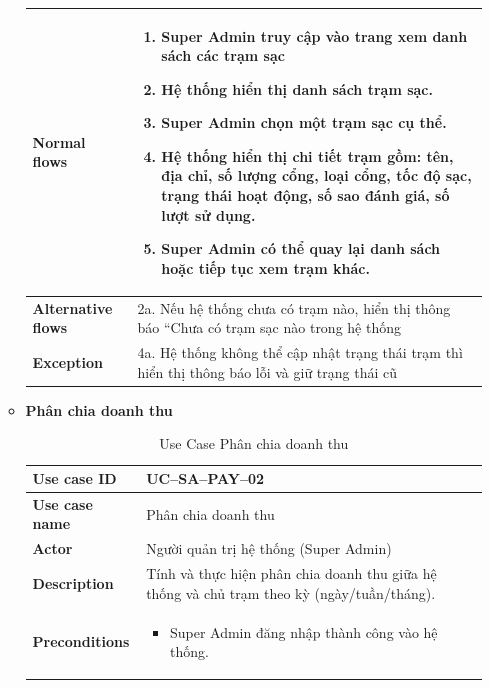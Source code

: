 \begin{enumerate}[label=\textbf{\alph*)}]
\begin{itemize}
\begin{center}
\begin{longtable}{|m{}|m{}|}
          \hline
          \textbf{Normal flows} &
          \begin{enumerate}[label=\arabic*.]
            \item Super Admin truy cập vào trang xem danh sách các trạm sạc
            \item Hệ thống hiển thị danh sách trạm sạc.
            \item Super Admin chọn một trạm sạc cụ thể.
            \item Hệ thống hiển thị chi tiết trạm gồm: tên, địa chỉ, số lượng cổng, loại cổng, tốc độ sạc, trạng thái hoạt động, số sao đánh giá, số lượt sử dụng.
            \item Super Admin có thể quay lại danh sách hoặc tiếp tục xem trạm khác.

          \end{enumerate}\\
          \hline
          \textbf{Alternative flows} &
          2a. Nếu hệ thống chưa có trạm nào, hiển thị thông báo “Chưa có trạm sạc nào trong hệ thống\\
          \hline
          \textbf{Exception} &
          4a. Hệ thống không thể cập nhật trạng thái trạm thì hiển thị thông báo lỗi và giữ trạng thái cũ\\
          \hline
          \end{longtable}
      \end{center}
    \item \textbf{Phân chia doanh thu}
      \begin{center}
        \renewcommand{\arraystretch}{1.5}
        \begin{longtable}{|m{}|m{}|}
          \caption{Use Case Phân chia doanh thu}
          \label{tab:uc_sa_pay_02} \\
          \hline
          \textbf{Use case ID} & UC--SA--PAY--02 \\
          \hline
          \textbf{Use case name} & Phân chia doanh thu \\
          \hline
          \textbf{Actor} & Người quản trị hệ thống (Super Admin) \\
          \hline
          \textbf{Description} & Tính và thực hiện phân chia doanh thu giữa hệ thống và chủ trạm theo kỳ (ngày/tuần/tháng).\\
          \hline
          \textbf{Preconditions} &
          \begin{itemize}
            \item Super Admin đăng nhập thành công vào hệ thống.

\end{itemize}
\end{longtable}
\end{center}
\end{itemize}
\end{enumerate}
